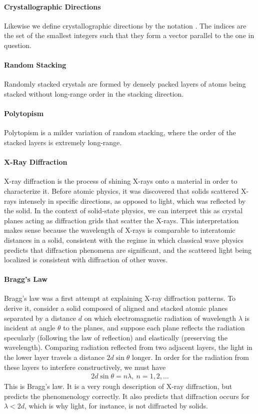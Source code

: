 \paragraph{Crystallographic Directions}
Likewise we define crystallographic directions by the notation . The indices are the set of the smallest integers such that they form a vector parallel to the one in question.

\paragraph{Random Stacking}
Randomly stacked crystals are formed by densely packed layers of atoms being stacked without long-range order in the stacking direction.

\paragraph{Polytopism}
Polytopism is a milder variation of random stacking, where the order of the stacked layers is extremely long-range.


\paragraph{X-Ray Diffraction}
X-ray diffraction is the process of shining X-rays onto a material in order to characterize it. Before atomic physics, it was discovered that solids scattered X-rays intensely in specific directions, as opposed to light, which was reflected by the solid. In the context of solid-state physics, we can interpret this as crystal planes acting as diffraction grids that scatter the X-rays. This interpretation makes sense because the wavelength of X-rays is comparable to interatomic distances in a solid, consistent with the regime in which classical wave physics predicts that diffraction phenomena are significant, and the scattered light being localized is consistent with diffraction of other waves.

\paragraph{Bragg's Law}
Bragg's law was a first attempt at explaining X-ray diffraction patterns. To derive it, consider a solid composed of aligned and stacked atomic planes separated by a distance $d$ on which electromagnetic radiation of wavelength $\lambda$ is incident at angle $\theta$ to the planes, and suppose each plane reflects the radiation specularly (following the law of reflection) and elastically (preserving the wavelength). Comparing radiation reflected from two adjacent layers, the light in the lower layer travels a distance $2d\sin{\theta}$ longer. In order for the radiation from these layers to interfere constructively, we must have
\begin{align*}
	2d\sin{\theta} = n\lambda,\ n = 1, 2, \dots
\end{align*}
This is Bragg's law. It is a very rough description of X-ray diffraction, but predicts the phenomenology correctly. It also predicts that diffraction occurs for $\lambda < 2d$, which is why light, for instance, is not diffracted by solids.

